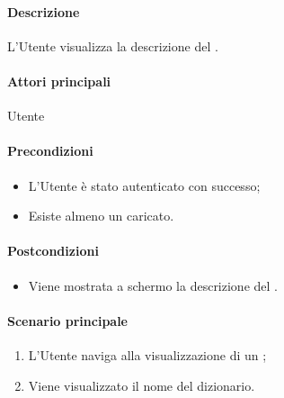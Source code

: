 \paragraph*{Descrizione}
L’Utente visualizza la descrizione del .

\paragraph*{Attori principali}
Utente

\paragraph*{Precondizioni}
\begin{itemize}
  \item L’Utente è stato autenticato con successo;
  \item Esiste almeno un  caricato.
\end{itemize}

\paragraph*{Postcondizioni}
\begin{itemize}
  \item Viene mostrata a schermo la descrizione del .
\end{itemize}

\paragraph*{Scenario principale}
\begin{enumerate}
  \item L’Utente naviga alla visualizzazione di un ;
  \item Viene visualizzato il nome del dizionario.
\end{enumerate}
